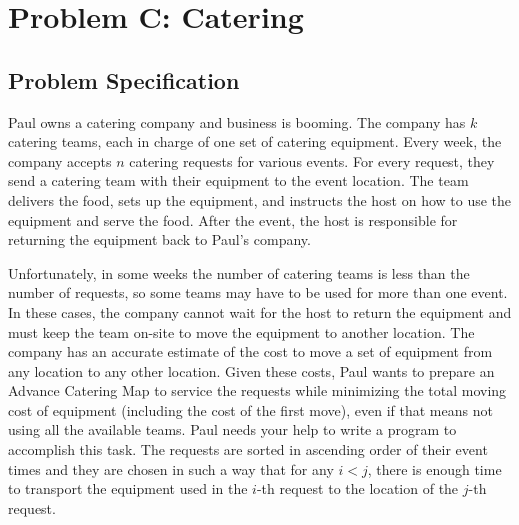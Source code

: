 \documentclass[12pt]{article}
\begin{document}

\newcommand{\hmwkClass}{CS 255}
\newcommand{\hmwkSemester}{Spring 2016}

\newcommand{\hmwkAuthorName}{Christian Rentsman}
\newcommand{\hmwkAuthorID}{crentsman}

\newcommand{\hmwkAssignmentNum}{5}

\newcommand{\hmwkProblemNum}{1}

\newcommand{\hmwkCollaborators}{}
\thispagestyle{fancycollab}


\section{Problem C: Catering}

\subsection{Problem Specification}


Paul owns a catering company and business is booming. The company has $k$
catering teams, each in charge of one set of catering equipment. Every
week, the company accepts $n$ catering requests for various events.
For every request, they send a catering team with their equipment to the
event location. The team delivers the food, sets up the equipment, and instructs
the host on how to use the equipment and serve the food. After the event, the
host is responsible for returning the equipment back to Paul’s company.

Unfortunately, in some weeks the number of catering teams is less than the number
of requests, so some teams may have to be used for more than one event. In these
cases, the company cannot wait for the host to return the equipment and must keep
the team on-site to move the equipment to another location. The company has an
accurate estimate of the cost to move a set of equipment from any location to any
other location. Given these costs, Paul wants to prepare an Advance Catering Map
to service the requests while minimizing the total moving cost of equipment
(including the cost of the first move), even if that means not using all the
available teams. Paul needs your help to write a program to accomplish this task.
The requests are sorted in ascending order of their event times and they are
chosen in such a way that for any $i < j$, there is enough time to
transport the equipment used in the $i$-th request to the location of the
$j$-th request.
\end{document}

